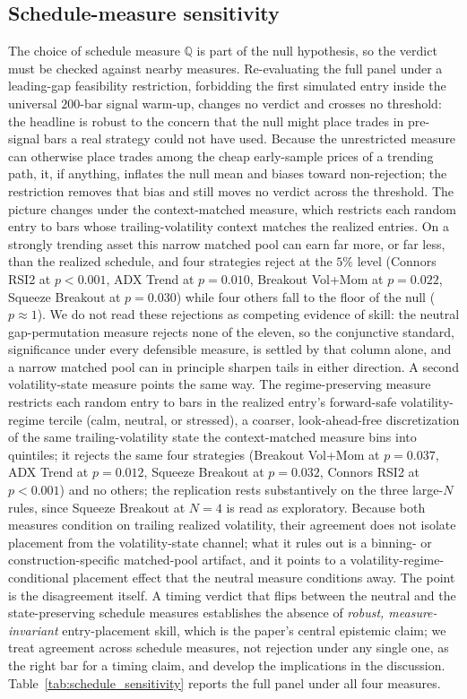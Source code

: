 \documentclass[preprint,12pt]{elsarticle}
\theoremstyle{definition}
\begin{document}
\subsection{Schedule-measure sensitivity}
\label{sec:schedule-sensitivity}

The choice of schedule measure $\mathbb{Q}$ is part of the null hypothesis, so the verdict must be checked against nearby measures. Re-evaluating the full panel under a leading-gap feasibility restriction, forbidding the first simulated entry inside the universal $200$-bar signal warm-up, changes no verdict and crosses no threshold: the headline is robust to the concern that the null might place trades in pre-signal bars a real strategy could not have used. Because the unrestricted measure can otherwise place trades among the cheap early-sample prices of a trending path, it, if anything, inflates the null mean and biases toward non-rejection; the restriction removes that bias and still moves no verdict across the threshold. The picture changes under the context-matched measure, which restricts each random entry to bars whose trailing-volatility context matches the realized entries. On a strongly trending asset this narrow matched pool can earn far more, or far less, than the realized schedule, and four strategies reject at the $5\%$ level (Connors RSI2 at $p<0.001$, ADX Trend at $p=0.010$, Breakout Vol+Mom at $p=0.022$, Squeeze Breakout at $p=0.030$) while four others fall to the floor of the null ($p\approx1$). We do not read these rejections as competing evidence of skill: the neutral gap-permutation measure rejects none of the eleven, so the conjunctive standard, significance under every defensible measure, is settled by that column alone, and a narrow matched pool can in principle sharpen tails in either direction. A second volatility-state measure points the same way. The regime-preserving measure restricts each random entry to bars in the realized entry's forward-safe volatility-regime tercile (calm, neutral, or stressed), a coarser, look-ahead-free discretization of the same trailing-volatility state the context-matched measure bins into quintiles; it rejects the same four strategies (Breakout Vol+Mom at $p=0.037$, ADX Trend at $p=0.012$, Squeeze Breakout at $p=0.032$, Connors RSI2 at $p<0.001$) and no others; the replication rests substantively on the three large-$N$ rules, since Squeeze Breakout at $N=4$ is read as exploratory. Because both measures condition on trailing realized volatility, their agreement does not isolate placement from the volatility-state channel; what it rules out is a binning- or construction-specific matched-pool artifact, and it points to a volatility-regime-conditional placement effect that the neutral measure conditions away. The point is the disagreement itself. A timing verdict that flips between the neutral and the state-preserving schedule measures establishes the absence of \emph{robust, measure-invariant} entry-placement skill, which is the paper's central epistemic claim; we treat agreement across schedule measures, not rejection under any single one, as the right bar for a timing claim, and develop the implications in the discussion. Table~\ref{tab:schedule_sensitivity} reports the full panel under all four measures.
\end{document}
